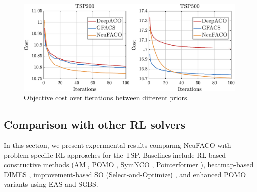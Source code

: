 \documentclass[a4paper,conference]{IEEEtran}
\begin{document}
\begin{figure}[!tb]
  \centering
  \includegraphics[width=\linewidth]{TSP200_vs_TSP500_3lines.pdf}
  \caption{Objective cost over iterations between different priors.}
  \label{fig:over_iterations}
\end{figure}

\subsection{Comparison with other RL solvers}
In this section, we present experimental results comparing NeuFACO with problem-specific RL approaches for the TSP. Baselines include RL-based constructive methods (AM \cite{am}, POMO \cite{pomo}, SymNCO \cite{symaco}, Pointerformer \cite{pointerformer}), heatmap-based DIMES \cite{dimes}, improvement-based SO (Select-and-Optimize) \cite{SelectAndOptimize}, and enhanced POMO variants using EAS and SGBS.

\end{document}
